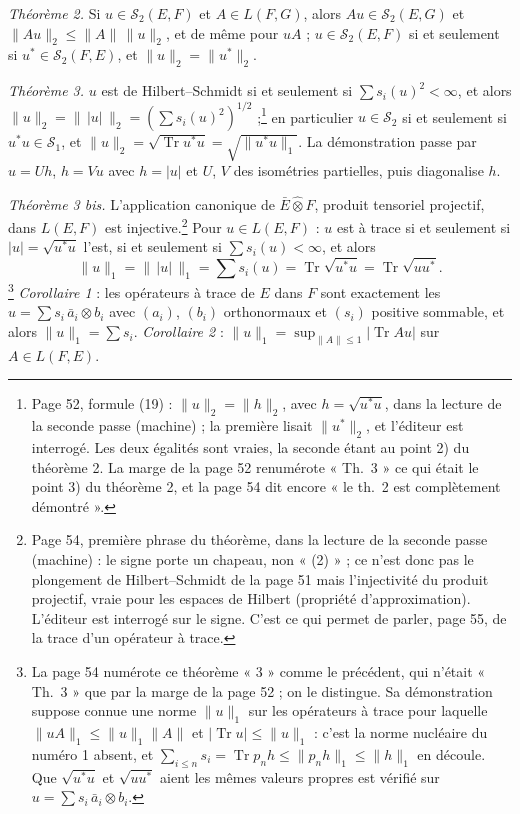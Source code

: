 \documentclass[11pt,a4paper]{article}
\begin{document}
\emph{Théorème 2.} Si $u \in \mathcal{S}_2(E,F)$ et $A \in L(F,G)$, alors
$Au \in \mathcal{S}_2(E,G)$ et $\|Au\|_2 \leq \|A\|\,\|u\|_2$, et de même
pour $uA$ ; $u \in \mathcal{S}_2(E,F)$ si et seulement si $u^{*} \in
\mathcal{S}_2(F,E)$, et $\|u\|_2 = \|u^{*}\|_2$.

\emph{Théorème 3.} $u$ est de Hilbert--Schmidt si et seulement si $\sum
s_i(u)^2 < \infty$, et alors $\|u\|_2 = \|\,|u|\,\|_2 = (\sum
s_i(u)^2)^{1/2}$ ;\footnote{Page 52, formule (19) : $\|u\|_2 = \|h\|_2$,
avec $h = \sqrt{u^{*}u}$, dans la lecture de la seconde passe (machine) ; la
première lisait $\|u^{*}\|_2$, et l'éditeur est interrogé. Les deux égalités
sont vraies, la seconde étant au point 2) du théorème 2. La marge de la page
52 renumérote « Th.~3 » ce qui était le point 3) du théorème 2, et la page
54 dit encore « le th.~2 est complètement démontré ».}
en particulier $u \in \mathcal{S}_2$ si et seulement si $u^{*}u \in
\mathcal{S}_1$, et $\|u\|_2 = \sqrt{\operatorname{Tr} u^{*}u} =
\sqrt{\|u^{*}u\|_1}$. La démonstration passe par $u = Uh$, $h = Vu$ avec
$h = |u|$ et $U$, $V$ des isométries partielles, puis diagonalise $h$.

\emph{Théorème 3 bis.} L'application canonique de $\bar{E}
\mathbin{\hat\otimes} F$, produit tensoriel projectif, dans $L(E,F)$ est
injective.\footnote{Page 54, première phrase du théorème, dans la lecture
de la seconde passe (machine) : le signe porte un chapeau, non « (2) » ; ce
n'est donc pas le plongement de Hilbert--Schmidt de la page 51 mais
l'injectivité du produit projectif, vraie pour les espaces de Hilbert
(propriété d'approximation). L'éditeur est interrogé sur le signe. C'est ce
qui permet de parler, page 55, de la trace d'un opérateur à trace.} Pour $u
\in L(E,F)$ : $u$ est à trace si et seulement
si $|u| = \sqrt{u^{*}u}$ l'est, si et seulement si $\sum s_i(u) < \infty$, et
alors
\[
  \|u\|_1 = \|\,|u|\,\|_1 = \sum s_i(u) = \operatorname{Tr}\sqrt{u^{*}u}
  = \operatorname{Tr}\sqrt{uu^{*}} .
\]
\footnote{La page 54 numérote ce théorème « 3 » comme le précédent, qui
n'était « Th.~3 » que par la marge de la page 52 ; on le distingue. Sa démonstration suppose connue une norme $\|u\|_1$ sur les
opérateurs à trace pour laquelle $\|uA\|_1 \leq \|u\|_1\|A\|$ et
$|\operatorname{Tr} u| \leq \|u\|_1$ : c'est la norme nucléaire du numéro 1
absent, et $\sum_{i \leq n} s_i = \operatorname{Tr} p_n h \leq \|p_n h\|_1
\leq \|h\|_1$ en découle. Que $\sqrt{u^{*}u}$ et $\sqrt{uu^{*}}$ aient les
mêmes valeurs propres est vérifié sur $u = \sum s_i\,\bar{a}_i \otimes b_i$.}
\emph{Corollaire 1} : les opérateurs à trace de $E$ dans $F$ sont exactement
les $u = \sum s_i\,\bar{a}_i \otimes b_i$ avec $(a_i)$, $(b_i)$ orthonormaux
et $(s_i)$ positive sommable, et alors $\|u\|_1 = \sum s_i$.
\emph{Corollaire 2} : $\|u\|_1 = \sup_{\|A\| \leq 1} |\operatorname{Tr} Au|$
sur $A \in L(F,E)$.
\end{document}
